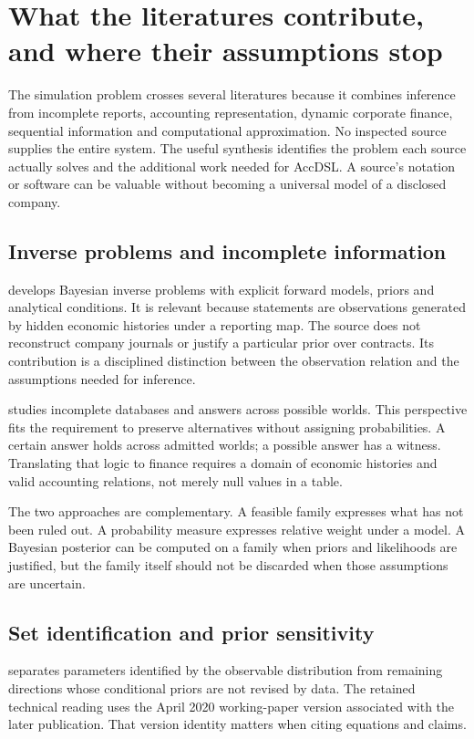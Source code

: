 \chapter[What the literatures contribute]{What the literatures contribute, and where their assumptions stop}
\label{sim:literature-synthesis}

The simulation problem crosses several literatures because it combines inference from incomplete reports, accounting representation, dynamic corporate finance, sequential information and computational approximation. No inspected source supplies the entire system. The useful synthesis identifies the problem each source actually solves and the additional work needed for AccDSL. A source's notation or software can be valuable without becoming a universal model of a disclosed company.



\section{Inverse problems and incomplete information}
\citet{stuart2010} develops Bayesian inverse problems with explicit forward models, priors and analytical conditions. It is relevant because statements are observations generated by hidden economic histories under a reporting map. The source does not reconstruct company journals or justify a particular prior over contracts. Its contribution is a disciplined distinction between the observation relation and the assumptions needed for inference.

\citet{libkin2014,libkin2016certain} studies incomplete databases and answers across possible worlds. This perspective fits the requirement to preserve alternatives without assigning probabilities. A certain answer holds across admitted worlds; a possible answer has a witness. Translating that logic to finance requires a domain of economic histories and valid accounting relations, not merely null values in a table.

The two approaches are complementary. A feasible family expresses what has not been ruled out. A probability measure expresses relative weight under a model. A Bayesian posterior can be computed on a family when priors and likelihoods are justified, but the family itself should not be discarded when those assumptions are uncertain.

\section{Set identification and prior sensitivity}
\citet[Sections 2.1--2.3]{giacomini2021} separates parameters identified by the observable distribution from remaining directions whose conditional priors are not revised by data. The retained technical reading uses the April 2020 working-paper version associated with the later publication. That version identity matters when citing equations and claims.

